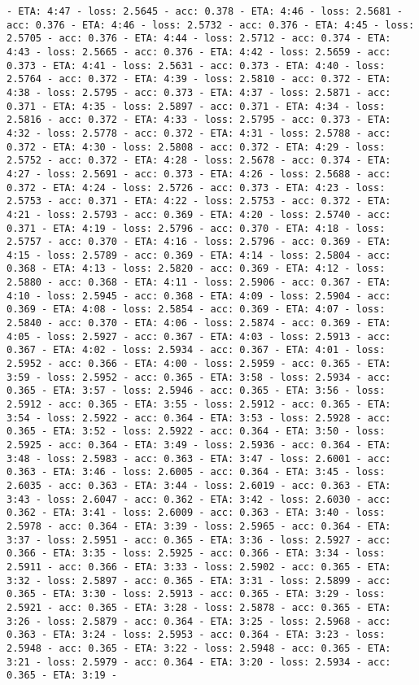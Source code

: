 \documentclass[11pt]{article}
\begin{document}
\begin{Verbatim}[commandchars=\\\{\}]
- ETA: 4:47 - loss: 2.5645 - acc: 0.378 - ETA: 4:46 - loss: 2.5681 - acc: 0.376 - ETA: 4:46 - loss: 2.5732 - acc: 0.376 - ETA: 4:45 - loss: 2.5705 - acc: 0.376 - ETA: 4:44 - loss: 2.5712 - acc: 0.374 - ETA: 4:43 - loss: 2.5665 - acc: 0.376 - ETA: 4:42 - loss: 2.5659 - acc: 0.373 - ETA: 4:41 - loss: 2.5631 - acc: 0.373 - ETA: 4:40 - loss: 2.5764 - acc: 0.372 - ETA: 4:39 - loss: 2.5810 - acc: 0.372 - ETA: 4:38 - loss: 2.5795 - acc: 0.373 - ETA: 4:37 - loss: 2.5871 - acc: 0.371 - ETA: 4:35 - loss: 2.5897 - acc: 0.371 - ETA: 4:34 - loss: 2.5816 - acc: 0.372 - ETA: 4:33 - loss: 2.5795 - acc: 0.373 - ETA: 4:32 - loss: 2.5778 - acc: 0.372 - ETA: 4:31 - loss: 2.5788 - acc: 0.372 - ETA: 4:30 - loss: 2.5808 - acc: 0.372 - ETA: 4:29 - loss: 2.5752 - acc: 0.372 - ETA: 4:28 - loss: 2.5678 - acc: 0.374 - ETA: 4:27 - loss: 2.5691 - acc: 0.373 - ETA: 4:26 - loss: 2.5688 - acc: 0.372 - ETA: 4:24 - loss: 2.5726 - acc: 0.373 - ETA: 4:23 - loss: 2.5753 - acc: 0.371 - ETA: 4:22 - loss: 2.5753 - acc: 0.372 - ETA: 4:21 - loss: 2.5793 - acc: 0.369 - ETA: 4:20 - loss: 2.5740 - acc: 0.371 - ETA: 4:19 - loss: 2.5796 - acc: 0.370 - ETA: 4:18 - loss: 2.5757 - acc: 0.370 - ETA: 4:16 - loss: 2.5796 - acc: 0.369 - ETA: 4:15 - loss: 2.5789 - acc: 0.369 - ETA: 4:14 - loss: 2.5804 - acc: 0.368 - ETA: 4:13 - loss: 2.5820 - acc: 0.369 - ETA: 4:12 - loss: 2.5880 - acc: 0.368 - ETA: 4:11 - loss: 2.5906 - acc: 0.367 - ETA: 4:10 - loss: 2.5945 - acc: 0.368 - ETA: 4:09 - loss: 2.5904 - acc: 0.369 - ETA: 4:08 - loss: 2.5854 - acc: 0.369 - ETA: 4:07 - loss: 2.5840 - acc: 0.370 - ETA: 4:06 - loss: 2.5874 - acc: 0.369 - ETA: 4:05 - loss: 2.5927 - acc: 0.367 - ETA: 4:03 - loss: 2.5913 - acc: 0.367 - ETA: 4:02 - loss: 2.5934 - acc: 0.367 - ETA: 4:01 - loss: 2.5952 - acc: 0.366 - ETA: 4:00 - loss: 2.5959 - acc: 0.365 - ETA: 3:59 - loss: 2.5952 - acc: 0.365 - ETA: 3:58 - loss: 2.5934 - acc: 0.365 - ETA: 3:57 - loss: 2.5946 - acc: 0.365 - ETA: 3:56 - loss: 2.5912 - acc: 0.365 - ETA: 3:55 - loss: 2.5912 - acc: 0.365 - ETA: 3:54 - loss: 2.5922 - acc: 0.364 - ETA: 3:53 - loss: 2.5928 - acc: 0.365 - ETA: 3:52 - loss: 2.5922 - acc: 0.364 - ETA: 3:50 - loss: 2.5925 - acc: 0.364 - ETA: 3:49 - loss: 2.5936 - acc: 0.364 - ETA: 3:48 - loss: 2.5983 - acc: 0.363 - ETA: 3:47 - loss: 2.6001 - acc: 0.363 - ETA: 3:46 - loss: 2.6005 - acc: 0.364 - ETA: 3:45 - loss: 2.6035 - acc: 0.363 - ETA: 3:44 - loss: 2.6019 - acc: 0.363 - ETA: 3:43 - loss: 2.6047 - acc: 0.362 - ETA: 3:42 - loss: 2.6030 - acc: 0.362 - ETA: 3:41 - loss: 2.6009 - acc: 0.363 - ETA: 3:40 - loss: 2.5978 - acc: 0.364 - ETA: 3:39 - loss: 2.5965 - acc: 0.364 - ETA: 3:37 - loss: 2.5951 - acc: 0.365 - ETA: 3:36 - loss: 2.5927 - acc: 0.366 - ETA: 3:35 - loss: 2.5925 - acc: 0.366 - ETA: 3:34 - loss: 2.5911 - acc: 0.366 - ETA: 3:33 - loss: 2.5902 - acc: 0.365 - ETA: 3:32 - loss: 2.5897 - acc: 0.365 - ETA: 3:31 - loss: 2.5899 - acc: 0.365 - ETA: 3:30 - loss: 2.5913 - acc: 0.365 - ETA: 3:29 - loss: 2.5921 - acc: 0.365 - ETA: 3:28 - loss: 2.5878 - acc: 0.365 - ETA: 3:26 - loss: 2.5879 - acc: 0.364 - ETA: 3:25 - loss: 2.5968 - acc: 0.363 - ETA: 3:24 - loss: 2.5953 - acc: 0.364 - ETA: 3:23 - loss: 2.5948 - acc: 0.365 - ETA: 3:22 - loss: 2.5948 - acc: 0.365 - ETA: 3:21 - loss: 2.5979 - acc: 0.364 - ETA: 3:20 - loss: 2.5934 - acc: 0.365 - ETA: 3:19 - 
\end{Verbatim}
\end{document}
